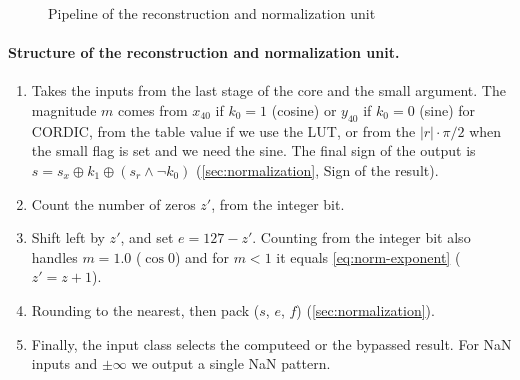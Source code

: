 \begin{figure}[H]
{%
  }
  \caption{Pipeline of the reconstruction and normalization unit}
  \label{fig:norm-unit}
\end{figure}

\paragraph{Structure of the reconstruction and normalization unit.}
\label{pa:rec-norm-unit-struc}

\begin{enumerate}[label=\textbf{Stage \arabic*.}, ref=\arabic*, leftmargin=*]
  \item Takes the inputs from the last stage of the core and the small argument. The magnitude $m$
    comes from $x_{40}$ if $k_0 = 1$ (cosine) or $y_{40}$ if $k_0 = 0$ (sine) for CORDIC, from
    the table value if we use the LUT, or from the $|r| \cdot \pi/2$ when the small flag is set and
    we need the sine. The final sign of the output is $s = s_{x} \oplus k_{1} \oplus (s_{r} \wedge \neg k_{0})$ (\cref{sec:normalization}, Sign of the result).
  \item Count the number of zeros $z'$, from the integer bit.
  \item Shift left by $z'$, and set $e = 127 - z'$. Counting from the integer bit also
    handles $m = 1.0$ ($\cos 0$) and for $m < 1$ it equals \cref{eq:norm-exponent} ($z' = z + 1$).
  \item Rounding to the nearest, then pack ($s$, $e$, $f$) (\cref{sec:normalization}).
  \item Finally, the input class selects the computeed or the bypassed result.
    For NaN inputs and $\pm \infty$ we output a single NaN pattern.
\end{enumerate}